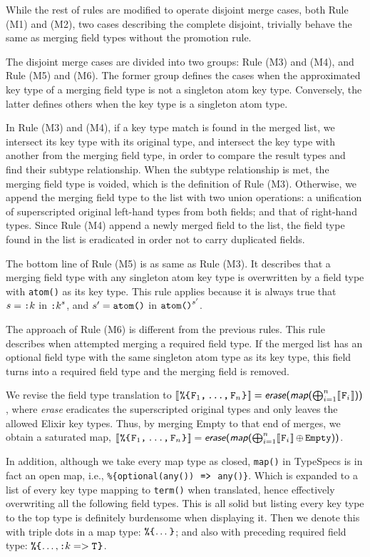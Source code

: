 While the rest of rules are modified to operate disjoint merge cases, both Rule \textsc{(M1)} and \textsc{(M2)}, two cases describing the complete disjoint, trivially behave the same as merging field types without the promotion rule.

The disjoint merge cases are divided into two groups: Rule \textsc{(M3)} and \textsc{(M4)}, and Rule \textsc{(M5)} and \textsc{(M6)}.
The former group defines the cases when the approximated key type of a merging field type is not a singleton atom key type.
Conversely, the latter defines others when the key type is a singleton atom type.

In Rule \textsc{(M3)} and \textsc{(M4)}, if a key type match is found in the merged list, we intersect its key type with its original type, and intersect the key type with another from the merging field type, in order to compare the result types and find their subtype relationship.
When the subtype relationship is met, the merging field type is voided, which is the definition of Rule \textsc{(M3)}.
Otherwise, we append the merging field type to the list with two union operations: a unification of superscripted original left-hand types from both fields; and that of right-hand types.
Since Rule \textsc{(M4)} append a newly merged field to the list, the field type found in the list is eradicated in order not to carry duplicated fields.

The bottom line of Rule \textsc{(M5)} is as same as Rule \textsc{(M3)}.
It describes that a merging field type with any singleton atom key type is overwritten by a field type with \texttt{atom()} as its key type.
This rule applies because it is always true that $s = \texttt{:$k$}$ in $\texttt{:$k$}^{s}$, and $s^{\prime} = \texttt{atom()}$ in $\texttt{atom()}^{s^{\prime}}$.

The approach of Rule \textsc{(M6)} is different from the previous rules.
This rule describes when attempted merging a required field type.
If the merged list has an optional field type with the same singleton atom type as its key type, this field turns into a required field type and the merging field is removed.

We revise the field type translation to $[\![\hspace{.07em}\texttt{\%\{}\hspace{.07em}\mbox{\ensuremath{\texttt{\texttt{F}$_1$,\,...,\,\texttt{F}$_n$}}}\hspace{.07em}\texttt{\}}\hspace{.07em}]\!] = \textsf{\textsl{erase}(\textsl{map}($\bigoplus_{i=1}^{n}$$[\![\hspace{.07em}\texttt{F}_i\hspace{.07em}]\!]$))}$, where \textsl{erase} eradicates the superscripted original types and only leaves the allowed Elixir key types. Thus, by merging \textsf{Empty} to that end of merges, we obtain a saturated map, $[\![\hspace{.07em}\texttt{\%\{}\hspace{.07em}\mbox{\ensuremath{\texttt{\texttt{F}$_1$,\,...,\,\texttt{F}$_n$}}}\hspace{.07em}\texttt{\}}\hspace{.07em}]\!] =\textsf{\textsl{erase}(\textsl{map}($\bigoplus_{i=1}^{n}$$[\![\hspace{.07em}\texttt{F}_i\hspace{.07em}]\!]$$\,\oplus\,\texttt{Empty}$))}$.

In addition, although we take every map type as closed, \texttt{map()} in TypeSpecs is in fact an open map, i.e., \texttt{\%\{optional(any())} $\;\texttt{=>}\;$ \texttt{any()\}}.
Which is expanded to a list of every key type mapping to \texttt{term()} when translated, hence effectively overwriting all the following field types.
This is all solid but listing every key type to the top type is definitely burdensome when displaying it.
Then we denote this with triple dots in a map type: $\texttt{\%\{}\hspace{.07em}\mbox{\ensuremath{\dots}}\hspace{.07em}\texttt{\}}$; and also with preceding required field type: $\texttt{\%\{}\hspace{.07em}\mbox{\ensuremath{\dots, \texttt{:$k$} => \texttt{T}}}\hspace{.07em}\texttt{\}}$.
